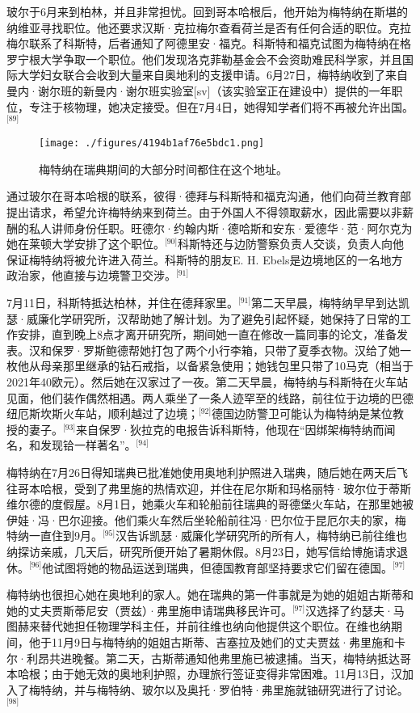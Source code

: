 玻尔于6月来到柏林，并且非常担忧。回到哥本哈根后，他开始为梅特纳在斯堪的纳维亚寻找职位。他还要求汉斯·克拉梅尔查看荷兰是否有任何合适的职位。克拉梅尔联系了科斯特，后者通知了阿德里安·福克。科斯特和福克试图为梅特纳在格罗宁根大学争取一个职位。他们发现洛克菲勒基金会不会资助难民科学家，并且国际大学妇女联合会收到大量来自奥地利的支援申请。6月27日，梅特纳收到了来自曼内·谢尔班的新曼内·谢尔班实验室[sv]（该实验室正在建设中）提供的一年职位，专注于核物理，她决定接受。但在7月4日，她得知学者们将不再被允许出国。\(^\text{[89]}\)
\begin{figure}[ht]
\centering
\texttt{[image: ./figures/4194b1af76e5bdc1.png]}
\caption{梅特纳在瑞典期间的大部分时间都住在这个地址。} \label{fig_LZm_9}
\end{figure}
通过玻尔在哥本哈根的联系，彼得·德拜与科斯特和福克沟通，他们向荷兰教育部提出请求，希望允许梅特纳来到荷兰。由于外国人不得领取薪水，因此需要以非薪酬的私人讲师身份任职。旺德尔·约翰内斯·德哈斯和安东·爱德华·范·阿尔克为她在莱顿大学安排了这个职位。\(^\text{[90]}\)科斯特还与边防警察负责人交谈，负责人向他保证梅特纳将被允许进入荷兰。科斯特的朋友E. H. Ebels是边境地区的一名地方政治家，他直接与边境警卫交涉。\(^\text{[91]}\)

7月11日，科斯特抵达柏林，并住在德拜家里。\(^\text{[91]}\)第二天早晨，梅特纳早早到达凯瑟·威廉化学研究所，汉帮助她了解计划。为了避免引起怀疑，她保持了日常的工作安排，直到晚上8点才离开研究所，期间她一直在修改一篇同事的论文，准备发表。汉和保罗·罗斯鲍德帮她打包了两个小行李箱，只带了夏季衣物。汉给了她一枚他从母亲那里继承的钻石戒指，以备紧急使用；她钱包里只带了10马克（相当于2021年40欧元）。然后她在汉家过了一夜。第二天早晨，梅特纳与科斯特在火车站见面，他们装作偶然相遇。两人乘坐了一条人迹罕至的线路，前往位于边境的巴德纽厄斯坎斯火车站，顺利越过了边境；\(^\text{[92]}\)德国边防警卫可能认为梅特纳是某位教授的妻子。\(^\text{[93]}\)来自保罗·狄拉克的电报告诉科斯特，他现在“因绑架梅特纳而闻名，和发现铪一样著名”。\(^\text{[94]}\)

梅特纳在7月26日得知瑞典已批准她使用奥地利护照进入瑞典，随后她在两天后飞往哥本哈根，受到了弗里施的热情欢迎，并住在尼尔斯和玛格丽特·玻尔位于蒂斯维尔德的度假屋。8月1日，她乘火车和轮船前往瑞典的哥德堡火车站，在那里她被伊娃·冯·巴尔迎接。他们乘火车然后坐轮船前往冯·巴尔位于昆厄尔夫的家，梅特纳一直住到9月。\(^\text{[95]}\)汉告诉凯瑟·威廉化学研究所的所有人，梅特纳已前往维也纳探访亲戚，几天后，研究所便开始了暑期休假。8月23日，她写信给博施请求退休。\(^\text{[96]}\)他试图将她的物品运送到瑞典，但德国教育部坚持要求它们留在德国。\(^\text{[97]}\)

梅特纳也很担心她在奥地利的家人。她在瑞典的第一件事就是为她的姐姐古斯蒂和她的丈夫贾斯蒂尼安（贾兹）·弗里施申请瑞典移民许可。\(^\text{[97]}\)汉选择了约瑟夫·马图赫来替代她担任物理学科主任，并前往维也纳向他提供这个职位。在维也纳期间，他于11月9日与梅特纳的姐姐古斯蒂、吉塞拉及她们的丈夫贾兹·弗里施和卡尔·利昂共进晚餐。第二天，古斯蒂通知他弗里施已被逮捕。当天，梅特纳抵达哥本哈根；由于她无效的奥地利护照，办理旅行签证变得非常困难。11月13日，汉加入了梅特纳，并与梅特纳、玻尔以及奥托·罗伯特·弗里施就铀研究进行了讨论。\(^\text{[98]}\)
